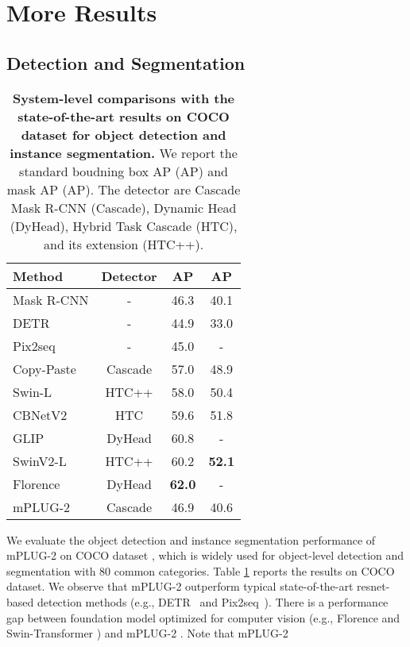 \documentclass{article}
\theoremstyle{plain}
\theoremstyle{definition}
\theoremstyle{remark}
\newcommand{\tablestyle}[2]{\setlength{\tabcolsep}{#1}\renewcommand{\arraystretch}{#2}\centering\small}
\newcommand{\modelname}{mPLUG-2 }
\begin{document}
\newpage
\appendix
\onecolumn

\section{More Results}


\subsection{Detection and Segmentation}
\begin{table}[t!]
\centering
    \caption{\textbf{System-level comparisons with the state-of-the-art results on COCO dataset for object detection and instance segmentation.} We report the standard boudning box AP (AP) and mask AP (AP). The detector are Cascade Mask R-CNN (Cascade), Dynamic Head (DyHead), Hybrid Task Cascade (HTC), and its extension (HTC++).
    }
    \tablestyle{7pt}{1.1} 
    \def \w{15pt}
\begin{tabular}{lc|cc}
\hline
Method                                 & Detector & AP & AP \\ \hline
Mask R-CNN \citep{He2017MaskR}         & -        & 46.3       & 40.1        \\
DETR \citep{Nicolas2020DETR}           & -        & 44.9       & 33.0        \\
Pix2seq \citep{chen2021pix2seq}        & -        & 45.0       & -           \\
Copy-Paste \citep{Golnaz2021copypaste} & Cascade  & 57.0       & 48.9        \\
Swin-L \citep{liu2021Swin}             & HTC++    & 58.0       & 50.4        \\
CBNetV2 \citep{Liang2021CBNetAC}       & HTC      & 59.6       & 51.8        \\
GLIP \citep{Li2021GLIP}                & DyHead   & 60.8       & -           \\
SwinV2-L \citep{Liu2021SwinTV}         & HTC++    & 60.2       & \textbf{52.1}        \\
Florence \citep{yuan2021florence}      & DyHead   & \textbf{62.0}       & -           \\ \hline
\modelname                             & Cascade  & 46.9       & 40.6        \\ \hline
\end{tabular}
\label{table:coco-detection}
\end{table}
 We evaluate the object detection and instance segmentation performance of \modelname on COCO dataset \citep{lin2014microsoft}, which is widely used for object-level detection and segmentation with 80 common categories. Table \ref{table:coco-detection} reports the results on COCO dataset. We observe that \modelname outperform typical state-of-the-art resnet-based detection methods (e.g., DETR~\citep{Nicolas2020DETR} and Pix2seq~\citep{chen2021pix2seq}). There is a performance gap between foundation model optimized for computer vision (e.g., Florence \citep{yuan2021florence} and Swin-Transformer \citep{liu2021Swin}) and \modelname. Note that \modelname 
\end{document}

